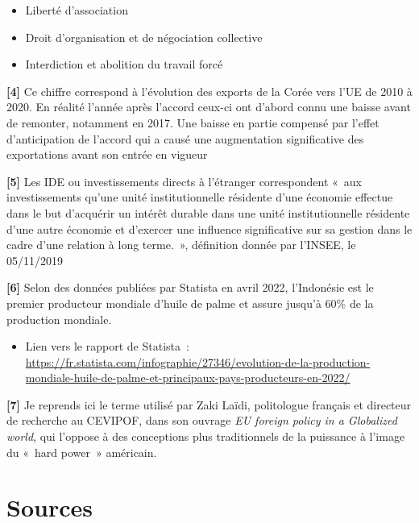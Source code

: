 \documentclass[11pt,a4paper]{article}
\begin{document}
\begin{itemize}
\item
  Liberté d'association
\item
  Droit d'organisation et de négociation collective
\item
  Interdiction et abolition du travail forcé
\end{itemize}

\textbf{{[}4{]}} Ce chiffre correspond à l'évolution des exports de la Corée vers l'UE de 2010 à 2020. En réalité l'année après l'accord ceux-ci ont d'abord connu une baisse avant de remonter, notamment en 2017. Une baisse en partie compensé par l'effet d'anticipation de l'accord qui a causé une augmentation significative des exportations avant son entrée en vigueur

\textbf{{[}5{]}} Les IDE ou investissements directs à l'étranger correspondent «~aux investissements qu'une unité institutionnelle résidente d'une économie effectue dans le but d'acquérir un intérêt durable dans une unité institutionnelle résidente d'une autre économie et d'exercer une influence significative sur sa gestion dans le cadre d'une relation à long terme.~», définition donnée par l'INSEE, le 05/11/2019

\textbf{{[}6{]}} Selon des données publiées par Statista en avril 2022, l'Indonésie est le premier producteur mondiale d'huile de palme et assure jusqu'à 60\% de la production mondiale.

\begin{itemize}
\item
  Lien vers le rapport de Statista~: \url{https://fr.statista.com/infographie/27346/evolution-de-la-production-mondiale-huile-de-palme-et-principaux-pays-producteurs-en-2022/}
\end{itemize}

\textbf{{[}7{]}} Je reprends ici le terme utilisé par Zaki Laïdi, politologue français et directeur de recherche au CEVIPOF, dans son ouvrage \emph{EU foreign policy in a Globalized world}, qui l'oppose à des conceptions plus traditionnels de la puissance à l'image du «~hard power~» américain.

\section{Sources}
\small
\end{document}
